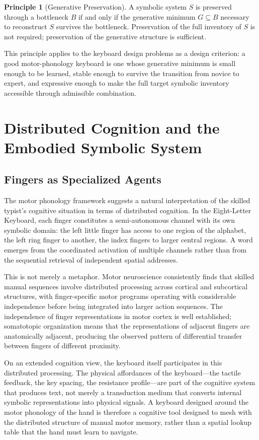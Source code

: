 \documentclass[12pt,a4paper]{article}
\theoremstyle{plain}
\theoremstyle{definition}
\newtheorem{principle}{Principle}
\theoremstyle{remark}
\begin{document}
\begin{principle}[Generative Preservation]
A symbolic system $S$ is preserved through a bottleneck $B$ if and only if
the generative minimum $G \subseteq B$ necessary to reconstruct $S$ survives
the bottleneck. Preservation of the full inventory of $S$ is not required;
preservation of the generative structure is sufficient.
\end{principle}

This principle applies to the keyboard design problems as a design criterion:
a good motor-phonology keyboard is one whose generative minimum is
small enough to be learned, stable enough to survive the transition from
novice to expert, and expressive enough to make the full target symbolic
inventory accessible through admissible combination.

\section{Distributed Cognition and the Embodied Symbolic System}

\subsection{Fingers as Specialized Agents}

The motor phonology framework suggests a natural interpretation of the
skilled typist's cognitive situation in terms of distributed cognition.
In the Eight-Letter Keyboard, each finger constitutes a semi-autonomous
channel with its own symbolic domain: the left little finger has access
to one region of the alphabet, the left ring finger to another, the index
fingers to larger central regions. A word emerges from the coordinated
activation of multiple channels rather than from the sequential retrieval
of independent spatial addresses.

This is not merely a metaphor. Motor neuroscience consistently finds that
skilled manual sequences involve distributed processing across cortical and
subcortical structures, with finger-specific motor programs operating with
considerable independence before being integrated into larger action sequences.
The independence of finger representations in motor cortex is well established;
somatotopic organization means that the representations of adjacent fingers
are anatomically adjacent, producing the observed pattern of differential
transfer between fingers of different proximity.

On an extended cognition view, the keyboard itself participates in this
distributed processing. The physical affordances of the keyboard---the
tactile feedback, the key spacing, the resistance profile---are part of the
cognitive system that produces text, not merely a transduction medium that
converts internal symbolic representations into physical signals. A keyboard
designed around the motor phonology of the hand is therefore a cognitive tool
designed to mesh with the distributed structure of manual motor memory, rather
than a spatial lookup table that the hand must learn to navigate.
\end{document}
